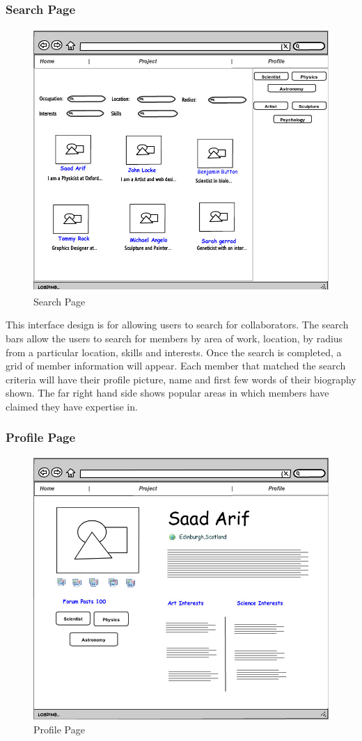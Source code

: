 \documentclass[a4paper,oneside,11pt]{report}
\begin{document}
\subsubsection{Search Page}
\begin{figure}[!ht]
\centering
\includegraphics[width=\textwidth,height=10cm]{People.jpg}
\caption{Search Page}
\end{figure}
This interface design is for allowing users to search for collaborators. The search bars allow the users to search for members by area of work, location, by radius from a particular location, skills and interests.
Once the search is completed, a grid of member information will appear. Each member that matched the search criteria will have their profile picture, name and first few words of their biography shown. The far right hand side shows popular areas in which members have claimed they have expertise in.

\pagebreak
\subsubsection{Profile Page}
\begin{figure}[!ht]
\centering
\includegraphics[width=\textwidth,height=10cm]{Profile.jpg}
\caption{Profile Page}
\end{figure}
\end{document}
